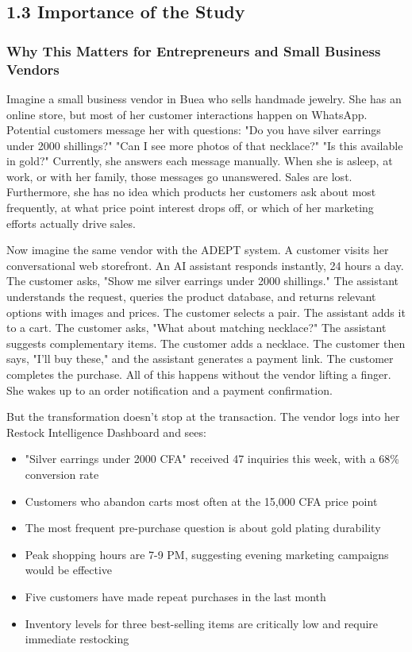 \documentclass[12pt,a4paper]{article}
\begin{document}
\subsection{1.3 Importance of the Study}

\subsubsection{Why This Matters for Entrepreneurs and Small Business Vendors}

Imagine a small business vendor in Buea who sells handmade jewelry. She has an online store, but most of her customer interactions happen on WhatsApp. Potential customers message her with questions: "Do you have silver earrings under 2000 shillings?" "Can I see more photos of that necklace?" "Is this available in gold?" Currently, she answers each message manually. When she is asleep, at work, or with her family, those messages go unanswered. Sales are lost. Furthermore, she has no idea which products her customers ask about most frequently, at what price point interest drops off, or which of her marketing efforts actually drive sales.

Now imagine the same vendor with the ADEPT system. A customer visits her conversational web storefront. An AI assistant responds instantly, 24 hours a day. The customer asks, "Show me silver earrings under 2000 shillings." The assistant understands the request, queries the product database, and returns relevant options with images and prices. The customer selects a pair. The assistant adds it to a cart. The customer asks, "What about matching necklace?" The assistant suggests complementary items. The customer adds a necklace. The customer then says, "I'll buy these," and the assistant generates a payment link. The customer completes the purchase. All of this happens without the vendor lifting a finger. She wakes up to an order notification and a payment confirmation.

But the transformation doesn't stop at the transaction. The vendor logs into her Restock Intelligence Dashboard and sees:

\begin{itemize}
    \item "Silver earrings under 2000 CFA" received 47 inquiries this week, with a 68\% conversion rate
    \item Customers who abandon carts most often at the 15,000 CFA price point
    \item The most frequent pre-purchase question is about gold plating durability
    \item Peak shopping hours are 7-9 PM, suggesting evening marketing campaigns would be effective
    \item Five customers have made repeat purchases in the last month
    \item Inventory levels for three best-selling items are critically low and require immediate restocking
\end{itemize}
\end{document}
